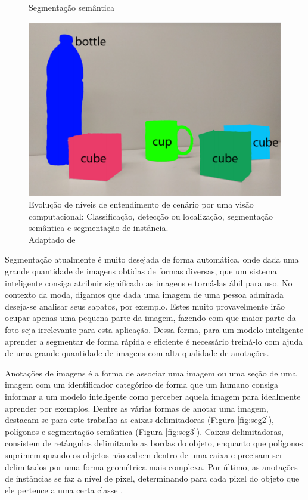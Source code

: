 \documentclass[12pt]{report}
\newcommand*{\captionsource}[2]{%
  \caption[{#1}]{%
    #1%
    \\\hspace{\linewidth}%
     \text{Fonte:}#2%
  }%
}
\begin{document}
\begin{figure}
\begin{minipage}[b]{0.4\textwidth}
    \caption{Segmentação semântica}
    \label{fig:seg3}
  \end{minipage}
    \hfill
  \begin{minipage}[b]{0.4\textwidth}
    \includegraphics[width=\textwidth]{images/seg4.png}
    \caption{Segmentação de instâncias}
    \label{fig:seg4}
  \end{minipage}
  \captionsource{Evolução de níveis de entendimento de cenário por uma visão computacional: Classificação, detecção ou localização, segmentação semântica e segmentação de instância.}{ Adaptado de \protect\cite{garcia-garcia}} 
  \label{fig:seg}
\end{figure}

Segmentação atualmente é muito desejada de forma automática, onde dada uma grande quantidade de imagens obtidas de formas diversas, que um sistema inteligente consiga atribuir significado as imagens e torná-las ábil para uso. No contexto da moda, digamos que dada uma imagem de uma pessoa admirada deseja-se analisar seus sapatos, por exemplo. Estes muito provavelmente irão ocupar apenas uma pequena parte da imagem, fazendo com que maior parte da foto seja irrelevante para esta aplicação. Dessa forma, para um modelo inteligente aprender a segmentar de forma rápida e eficiente é necessário treiná-lo com ajuda de uma grande quantidade de imagens com alta qualidade de anotações.

Anotações de imagens é a forma de associar uma imagem ou uma seção de uma imagem com um identificador categórico de forma que um humano consiga informar a um modelo inteligente como perceber aquela imagem para idealmente aprender por exemplos. Dentre as várias formas de anotar uma imagem, destacam-se para este trabalho as caixas delimitadoras (Figura \ref{fig:seg2}), polígonos e segmentação semântica (Figura \ref{fig:seg3}). Caixas delimitadoras, consistem de retângulos delimitando as bordas do objeto, enquanto que polígonos suprimem quando os objetos não cabem dentro de uma caixa e precisam ser delimitados por uma forma geométrica mais complexa. Por último, as anotações de instâncias se faz a nível de pixel, determinando para cada pixel do objeto que ele pertence a uma certa classe \cite{anno}.
\end{document}
